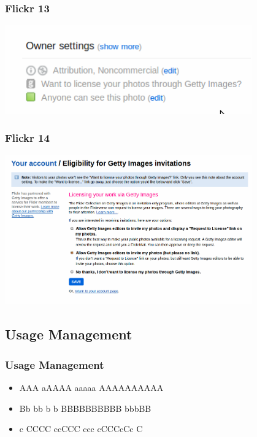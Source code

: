\documentclass[mathserif,xcolor=dvipsnames,hyperref={bookmarks=true}]{beamer}
\begin{document}
    \begin{frame}[t]
        \frametitle{Flickr 13}
        \begin{center}
            \includegraphics[width=0.8\textwidth]{want-to-license-your-photos-through-getty-images.png}
        \end{center}
    \end{frame}
    \begin{frame}[t]
        \frametitle{Flickr 14}
        \begin{center}
            \includegraphics[width=0.8\textwidth]{want-to-license-your-photos-through-getty-images2.png}
        \end{center}
    \end{frame}



    \subsection{Usage Management}
    \begin{frame}[t]
        \frametitle{Usage Management}
        \begin{itemize}
            \item<2-> AAA aAAAA aaaaa AAAAAAAAAA
            \item<3-> Bb bb b b BBBBBBBBBB bbbBB
            \item<4-> c CCCC ccCCC ccc cCCCcCc C
        \end{itemize}
    \end{frame}
\end{document}
